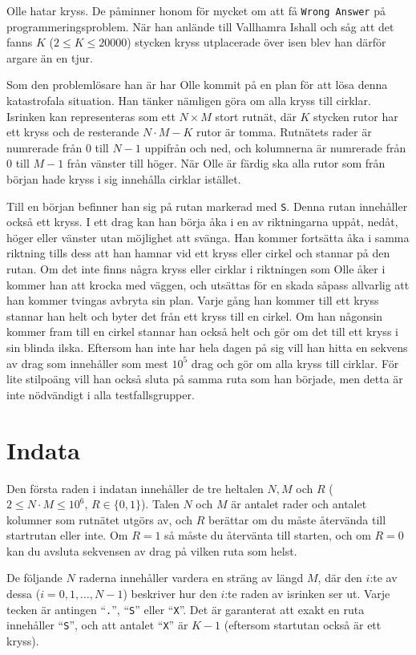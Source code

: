 \noindent
Olle hatar kryss. De påminner honom för mycket om att få \texttt{Wrong Answer} på programmeringsproblem. 
När han anlände till Vallhamra Ishall
och såg att det fanns $K$ ($2 \leq K \leq 20000$) stycken kryss utplacerade över isen blev han därför argare än en tjur.

Som den problemlösare han är har Olle kommit på en plan för att lösa denna katastrofala situation. 
Han tänker nämligen göra om alla kryss till cirklar.
Isrinken kan representeras
som ett $N \times M$ stort rutnät, där $K$ stycken rutor har ett kryss och de resterande $N \cdot M - K$ rutor är tomma.
Rutnätets rader är numrerade från $0$ till $N-1$ uppifrån och ned, och kolumnerna är numrerade från $0$ till $M-1$ från vänster till höger.
När Olle är färdig ska alla rutor som från början hade kryss i sig innehålla cirklar istället.

Till en början befinner han sig på rutan markerad med \texttt{S}. 
Denna rutan innehåller också ett kryss. 
I ett drag kan han börja åka i en av riktningarna uppåt, nedåt, höger eller vänster utan möjlighet att svänga. 
Han kommer fortsätta åka i samma riktning tills dess att han
hamnar vid ett kryss eller cirkel och stannar på den rutan.
Om det inte finns några kryss eller cirklar i riktningen som Olle åker i
kommer han att krocka med väggen, och utsättas för en skada såpass allvarlig
att han kommer tvingas avbryta sin plan. 
Varje gång han kommer till ett kryss stannar han helt och byter det från ett kryss till en cirkel.
Om han någonsin kommer fram till en cirkel stannar han också helt och gör om det till ett kryss i sin blinda ilska. 
Eftersom han inte har hela dagen
på sig vill han hitta en sekvens av drag som innehåller som mest \textbf{$10^5$} drag och gör om alla kryss till cirklar. 
För lite stilpoäng vill han
också sluta på samma ruta som han började, men detta är inte nödvändigt i alla testfallsgrupper.

\section*{Indata}
Den första raden i indatan innehåller de tre heltalen $N,M$ och $R$ ($2 \le N \cdot M \leq 10^6$, $R \in \{0,1\}$).
Talen $N$ och $M$ är antalet rader
och antalet kolumner som rutnätet utgörs av, 
och $R$ berättar om du måste återvända till startrutan eller inte.
Om $R = 1$ så måste du återvänta till starten, och om $R = 0$
kan du avsluta sekvensen av drag på vilken ruta som helst.

De följande $N$ raderna innehåller vardera en sträng av längd $M$, 
där den $i$:te av dessa ($i = 0, 1, \dots, N-1$) beskriver hur den $i$:te raden av isrinken ser ut.
Varje tecken är antingen ``\texttt{.}'', ``\texttt{S}'' eller ``\texttt{X}''. 
Det är garanterat att exakt en ruta innehåller 
``\texttt{S}'', och att antalet ``\texttt{X}'' är $K - 1$ (eftersom startutan också är ett kryss).


